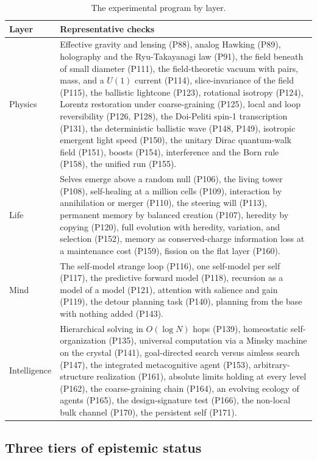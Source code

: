 \begin{table}[ht]
\centering
\caption{The experimental program by layer.}
\begin{tabular}{lp{}}
\toprule
Layer & Representative checks \\
\midrule
Physics & Effective gravity and lensing (P88), analog Hawking (P89), holography and the Ryu-Takayanagi law (P91), the field beneath of small diameter (P111), the field-theoretic vacuum with pairs, mass, and a $U(1)$ current (P114), slice-invariance of the field (P115), the ballistic lightcone (P123), rotational isotropy (P124), Lorentz restoration under coarse-graining (P125), local and loop reversibility (P126, P128), the Doi-Peliti spin-1 transcription (P131), the deterministic ballistic wave (P148, P149), isotropic emergent light speed (P150), the unitary Dirac quantum-walk field (P151), boosts (P154), interference and the Born rule (P158), the unified run (P155). \\
\addlinespace
Life & Selves emerge above a random null (P106), the living tower (P108), self-healing at a million cells (P109), interaction by annihilation or merger (P110), the steering will (P113), permanent memory by balanced creation (P107), heredity by copying (P120), full evolution with heredity, variation, and selection (P152), memory as conserved-charge information loss at a maintenance cost (P159), fission on the flat layer (P160). \\
\addlinespace
Mind & The self-model strange loop (P116), one self-model per self (P117), the predictive forward model (P118), recursion as a model of a model (P121), attention with salience and gain (P119), the detour planning task (P140), planning from the base with nothing added (P143). \\
\addlinespace
Intelligence & Hierarchical solving in $O(\log N)$ hops (P139), homeostatic self-organization (P135), universal computation via a Minsky machine on the crystal (P141), goal-directed search versus aimless search (P147), the integrated metacognitive agent (P153), arbitrary-structure realization (P161), absolute limits holding at every level (P162), the coarse-graining chain (P164), an evolving ecology of agents (P165), the design-signature test (P166), the non-local bulk channel (P170), the persistent self (P171). \\
\bottomrule
\end{tabular}
\end{table}

\subsection{Three tiers of epistemic status}

